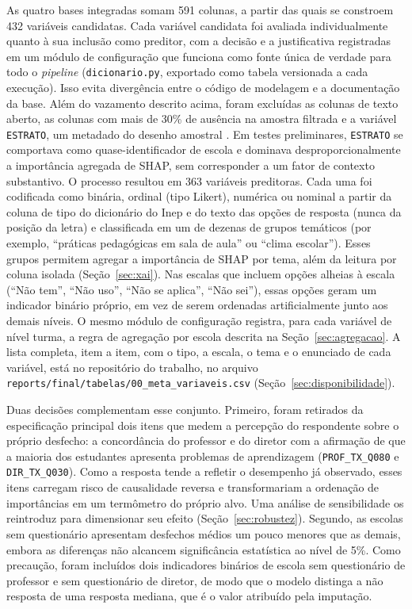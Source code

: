 As quatro bases integradas somam 591 colunas, a partir das quais se
constroem 432 variáveis candidatas. Cada variável candidata foi avaliada
individualmente quanto à sua inclusão como preditor, com a decisão e a
justificativa registradas em um módulo de configuração que funciona como
fonte única de verdade para todo o \textit{pipeline} (\texttt{dicionario.py},
exportado como tabela versionada a cada execução). Isso evita divergência
entre o código de modelagem e a documentação da base. Além do vazamento
descrito acima, foram excluídas as colunas de texto aberto, as colunas com
mais de 30\% de ausência na amostra filtrada e a variável
\texttt{ESTRATO}, um metadado do desenho amostral \cite{inep2026microdados}.
Em testes preliminares, \texttt{ESTRATO} se comportava como
quase-identificador de escola e dominava desproporcionalmente a importância
agregada de SHAP, sem corresponder a um fator de contexto substantivo. O
processo resultou em 363 variáveis preditoras. Cada uma foi codificada como
binária, ordinal (tipo Likert), numérica ou nominal a partir da coluna de
tipo do dicionário do Inep e do texto das opções de resposta (nunca da
posição da letra) e classificada em um de dezenas de grupos temáticos (por
exemplo, ``práticas pedagógicas em sala de aula'' ou ``clima escolar''). Esses
grupos permitem agregar a importância de SHAP por tema, além da leitura por
coluna isolada (Seção~\ref{sec:xai}). Nas escalas que incluem opções
alheias à escala (``Não tem'', ``Não uso'', ``Não se aplica'', ``Não sei''),
essas opções geram um indicador binário próprio, em vez de serem ordenadas
artificialmente junto aos demais níveis. O mesmo módulo de configuração
registra, para cada variável de nível turma, a regra de agregação por
escola descrita na Seção~\ref{sec:agregacao}. A lista completa, item a item, com
o tipo, a escala, o tema e o enunciado de cada variável, está no
repositório do trabalho, no arquivo
\texttt{reports/final/tabelas/00\_meta\_variaveis.csv}
(Seção~\ref{sec:disponibilidade}).

Duas decisões complementam esse conjunto. Primeiro, foram retirados da
especificação principal dois itens que medem a percepção do respondente
sobre o próprio desfecho: a concordância do professor e do diretor com a
afirmação de que a maioria dos estudantes apresenta problemas de
aprendizagem (\texttt{PROF\_TX\_Q080} e \texttt{DIR\_TX\_Q030}). Como a
resposta tende a refletir o desempenho já observado, esses itens carregam
risco de causalidade reversa e transformariam a ordenação de importâncias
em um termômetro do próprio alvo. Uma análise de sensibilidade os
reintroduz para dimensionar seu efeito (Seção~\ref{sec:robustez}). Segundo, as escolas sem
questionário apresentam desfechos médios um pouco menores que as demais,
embora as diferenças não alcancem significância estatística ao nível de
5\%. Como precaução, foram incluídos dois
indicadores binários de escola sem questionário de professor e sem
questionário de diretor, de modo que o modelo distinga a não resposta de
uma resposta mediana, que é o valor atribuído pela imputação.

